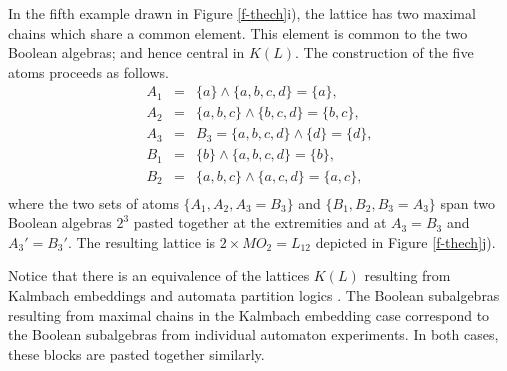 \documentclass[%
  preprint,
 showpacs,
 showkeys,
 preprintnumbers,
 amsmath,amssymb,
 aps,
 rmp,
  longbibliography,
 ]{revtex4-1}
\begin{document}
In the
fifth example drawn in Figure
\ref{f-thech}i), the lattice has two maximal chains
which
share a common element.  This element is common to the two Boolean
algebras; and hence central in $K(L)$.
The construction of the five atoms proceeds as follows.
\begin{eqnarray*}
A_1&=& \{a\}\wedge \{a,b,c,d\}=\{a\},\\
A_2&=& \{a,b,c\}\wedge \{b,c,d\}=\{b,c\},\\
A_3&=&B_3= \{a,b,c,d\}\wedge \{d\}=\{d\},\\
B_1&=& \{b\}\wedge \{a,b,c,d\}=\{b\},\\
B_2&=& \{a,b,c\}\wedge \{a,c,d\}=\{a,c\},\\
\end{eqnarray*}
where the two sets of atoms
$\{A_1,A_2,A_3=B_3\}$ and
$\{B_1,B_2,B_3=A_3\}$ span two Boolean algebras $2^3$ pasted together at
the extremities and at $A_3=B_3$ and $A_3'=B_3'$.
 The resulting lattice is $2\times
MO_2=L_{12}$ depicted in Figure
\ref{f-thech}j).

Notice that there is an equivalence of the lattices $K(L)$ resulting
from Kalmbach embeddings and automata partition logics \cite{svozil-93}.
The Boolean subalgebras resulting from maximal chains in
the Kalmbach embedding case correspond to the Boolean subalgebras from
individual automaton experiments. In both cases, these blocks are pasted
together similarly.
\end{document}
